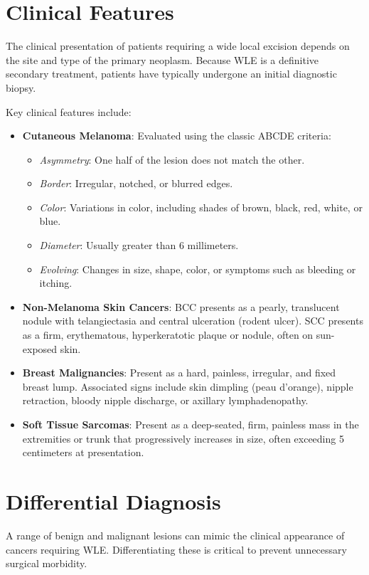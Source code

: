 \section*{Clinical Features}
The clinical presentation of patients requiring a wide local excision depends on the site and type of the primary neoplasm. Because WLE is a definitive secondary treatment, patients have typically undergone an initial diagnostic biopsy.

Key clinical features include:
\begin{itemize}
    \item \textbf{Cutaneous Melanoma}: Evaluated using the classic ABCDE criteria:
    \begin{itemize}
        \item \textit{Asymmetry}: One half of the lesion does not match the other.
        \item \textit{Border}: Irregular, notched, or blurred edges.
        \item \textit{Color}: Variations in color, including shades of brown, black, red, white, or blue.
        \item \textit{Diameter}: Usually greater than 6 millimeters.
        \item \textit{Evolving}: Changes in size, shape, color, or symptoms such as bleeding or itching.
    \end{itemize}
    \item \textbf{Non-Melanoma Skin Cancers}: BCC presents as a pearly, translucent nodule with telangiectasia and central ulceration (rodent ulcer). SCC presents as a firm, erythematous, hyperkeratotic plaque or nodule, often on sun-exposed skin.
    \item \textbf{Breast Malignancies}: Present as a hard, painless, irregular, and fixed breast lump. Associated signs include skin dimpling (peau d'orange), nipple retraction, bloody nipple discharge, or axillary lymphadenopathy.
    \item \textbf{Soft Tissue Sarcomas}: Present as a deep-seated, firm, painless mass in the extremities or trunk that progressively increases in size, often exceeding 5 centimeters at presentation.
\end{itemize}

\section*{Differential Diagnosis}
A range of benign and malignant lesions can mimic the clinical appearance of cancers requiring WLE. Differentiating these is critical to prevent unnecessary surgical morbidity.

